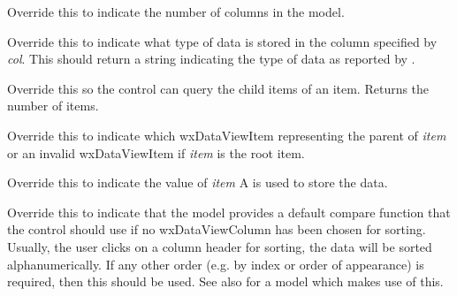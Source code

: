 \label{wxdataviewmodelgetcolumncount}


Override this to indicate the number of columns in the model.

\label{wxdataviewmodelgetcolumntype}


Override this to indicate what type of data is stored in the
column specified by {\it col}. This should return a string
indicating the type of data as reported by .

\label{wxdataviewmodelgetchildren}


Override this so the control can query the child items of
an item. Returns the number of items.

\label{wxdataviewmodelgetparent}


Override this to indicate which wxDataViewItem representing the parent
of {\it item} or an invalid wxDataViewItem if {\it item} is the root item.

\label{wxdataviewmodelgetvalue}


Override this to indicate the value of {\it item}
A  is used to store the data.

\label{wxdataviewmodelhasdefaultcompare}


Override this to indicate that the model provides a default compare
function that the control should use if no wxDataViewColumn has been
chosen for sorting. Usually, the user clicks on a column header for
sorting, the data will be sorted alphanumerically. If any other
order (e.g. by index or order of appearance) is required, then this
should be used. See also 
for a model which makes use of this.

